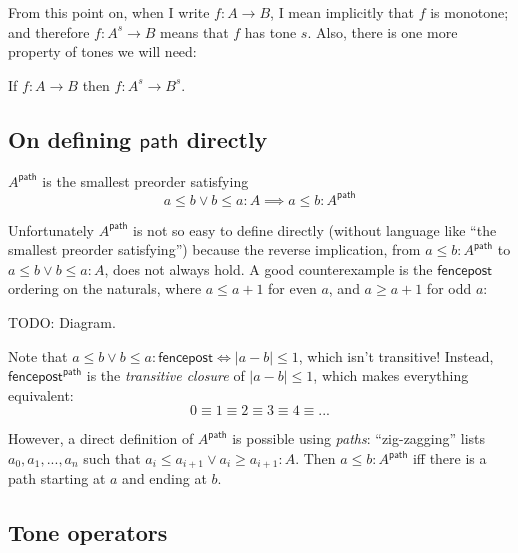 \documentclass[b5]{rntz}
\newcommand{\todo}[1]{{\color{red}#1}}
\newcommand{\ms}[1]{\ensuremath{\mathsf{#1}}}
\renewcommand{\path}{\ms{path}}
\begin{document}
From this point on, when I write $f : A \to B$, I mean implicitly that $f$ is
monotone; and therefore $f : A^s \to B$ means that $f$ has tone $s$.
%
Also, there is one more property of tones we will need:

\begin{theorem}\label{thm:tone-functoriality}
  If $f : A \to B$ then $f : A^s \to B^s$.
\end{theorem}


\subsection{On defining \ms{path} directly} \label{sec:defining-path}

$A^\path$ is the smallest preorder satisfying
\[ a \le b \vee b \le a : A \implies a \le b : A^\path \]

Unfortunately $A^\path$ is not so easy to define directly (without
language like ``the smallest preorder satisfying'')
%
because the reverse implication, from $a \le b : A^\path$ to $a \le b \vee b \le
a : A$, does not always hold. A good counterexample is the \ms{fencepost}
ordering on the naturals, where $a \le a+1$ for even $a$, and $a \ge a+1$ for
odd $a$:

\todo{TODO: Diagram}.

Note that $a \le b \vee b \le a : \ms{fencepost} \iff |a-b| \le 1$, which isn't
transitive! Instead, $\ms{fencepost}^\path$ is the \emph{transitive closure} of
$|a-b| \le 1$, which makes everything equivalent:
\[ 0 \equiv 1 \equiv 2 \equiv 3 \equiv 4 \equiv ... \]

However, a direct definition of $A^\path$ is possible using \emph{paths}:
``zig-zagging'' lists $a_0, a_1, ..., a_n$ such that $a_i \le a_{i+1} \vee a_i
\ge a_{i+1} : A$. Then $a \le b : A^\path$ iff there is a path starting at $a$
and ending at $b$.


\subsection{Tone operators}
\end{document}
